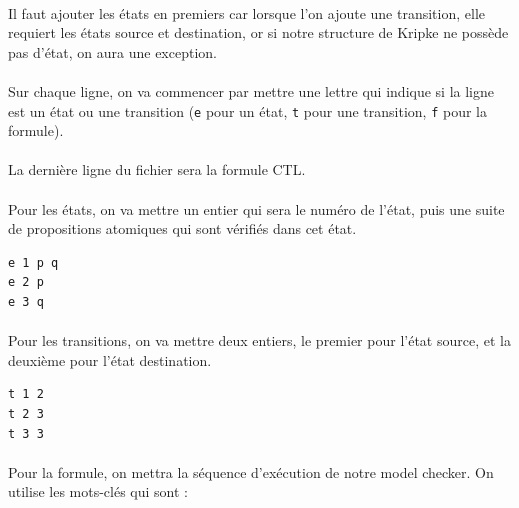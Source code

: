 \documentclass[12pt,a4paper]{report}
\begin{document}
\paragraph{}Il faut ajouter les états en premiers car lorsque l'on ajoute une transition, elle requiert les états source et destination, or si notre structure de Kripke ne possède pas d'état, on aura une exception.

\paragraph{}Sur chaque ligne, on va commencer par mettre une lettre qui indique si la ligne est un état ou une transition (\verb+e+ pour un état, \verb+t+ pour une transition, \verb+f+ pour la formule).

\paragraph{}La dernière ligne du fichier sera la formule CTL.

\paragraph{}Pour les états, on va mettre un entier qui sera le numéro de l'état, puis une suite de propositions atomiques qui sont vérifiés dans cet état.

\begin{verbatim}
e 1 p q
e 2 p
e 3 q
\end{verbatim}

\paragraph{}Pour les transitions, on va mettre deux entiers, le premier pour l'état source, et la deuxième pour l'état destination.

\begin{verbatim}
t 1 2
t 2 3
t 3 3
\end{verbatim}

\paragraph{}Pour la formule, on mettra la séquence d'exécution de notre model checker. On utilise les mots-clés qui sont :
\end{document}
